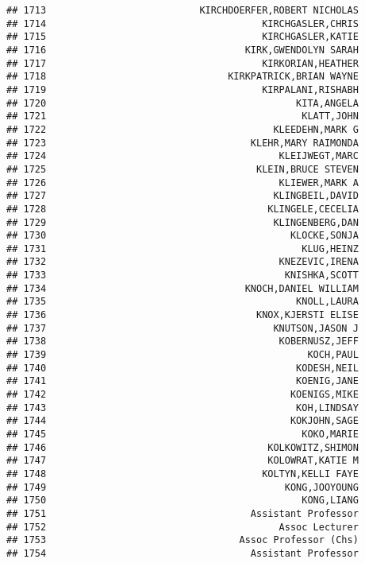 \documentclass[
]{article}
\begin{document}
\begin{verbatim}
## 1713                           KIRCHDOERFER,ROBERT NICHOLAS
## 1714                                      KIRCHGASLER,CHRIS
## 1715                                      KIRCHGASLER,KATIE
## 1716                                   KIRK,GWENDOLYN SARAH
## 1717                                      KIRKORIAN,HEATHER
## 1718                                KIRKPATRICK,BRIAN WAYNE
## 1719                                      KIRPALANI,RISHABH
## 1720                                            KITA,ANGELA
## 1721                                             KLATT,JOHN
## 1722                                        KLEEDEHN,MARK G
## 1723                                    KLEHR,MARY RAIMONDA
## 1724                                         KLEIJWEGT,MARC
## 1725                                     KLEIN,BRUCE STEVEN
## 1726                                         KLIEWER,MARK A
## 1727                                        KLINGBEIL,DAVID
## 1728                                       KLINGELE,CECELIA
## 1729                                        KLINGENBERG,DAN
## 1730                                           KLOCKE,SONJA
## 1731                                             KLUG,HEINZ
## 1732                                         KNEZEVIC,IRENA
## 1733                                          KNISHKA,SCOTT
## 1734                                   KNOCH,DANIEL WILLIAM
## 1735                                            KNOLL,LAURA
## 1736                                     KNOX,KJERSTI ELISE
## 1737                                        KNUTSON,JASON J
## 1738                                         KOBERNUSZ,JEFF
## 1739                                              KOCH,PAUL
## 1740                                            KODESH,NEIL
## 1741                                            KOENIG,JANE
## 1742                                           KOENIGS,MIKE
## 1743                                            KOH,LINDSAY
## 1744                                           KOKJOHN,SAGE
## 1745                                             KOKO,MARIE
## 1746                                       KOLKOWITZ,SHIMON
## 1747                                       KOLOWRAT,KATIE M
## 1748                                      KOLTYN,KELLI FAYE
## 1749                                          KONG,JOOYOUNG
## 1750                                             KONG,LIANG
## 1751                                    Assistant Professor
## 1752                                         Assoc Lecturer
## 1753                                  Assoc Professor (Chs)
## 1754                                    Assistant Professor

\end{verbatim}
\end{document}
